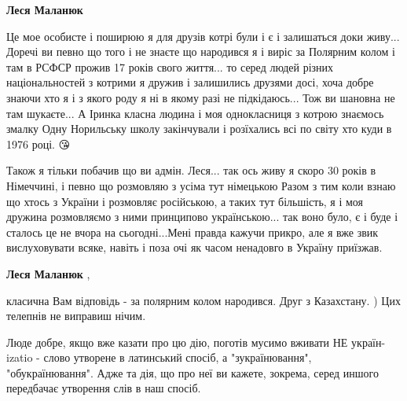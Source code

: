 \begin{itemize}
\begin{itemize}
\begin{itemize}
 
\textbf{Леся Маланюк} 

Це мое особисте і поширюю я для друзів котрі були і є і залишаться доки живу...
Доречі ви певно що того і не знаєте що народився я і виріс за Полярним колом і
там в РСФСР прожив 17 років свого життя... то серед людей різних
національностей з котрими я дружив і залишились друзями досі, хоча добре знаючи
хто я і з якого роду я ні в якому разі не підкідаюсь... Тож ви шановна не там
шукаєте... А Іринка класна людина і моя однокласниця з котрою знаємось змалку
Одну Норильську школу закінчували і розїхались всі по світу хто куди в 1976
році. 😘

Також я тільки побачив що ви адмін. Леся... так ось живу я скоро 30 років в
Німеччині, і певно що розмовляю з усіма тут німецькою Разом з тим коли взнаю що
хтось з України і розмовляє російською, а таких тут більшість, я і моя дружина
розмовляємо з ними принципово українською... так воно було, є і буде і сталось
це не вчора на сьогодні...Мені правда кажучи прикро, але я вже звик
вислуховувати всяке, навіть і поза очі як часом ненадовго в Україну приїзжав.


 
\textbf{Леся Маланюк} , 

класична Вам відповідь - за полярним колом народився. Друг з Казахстану. ) Цих
телепнів не виправиш нічим.

\end{itemize}

\end{itemize}

 

Люде добре, якщо вже казати про цю дію, поготів мусимо вживати НЕ україн-izatio
- слово утворене в латинський спосіб, а "зукраїнювання", "обукраїнювання". Адже
та дія, що про неї ви кажете, зокрема, серед иншого передбачає утворення слів в
наш спосіб.


\end{itemize}
